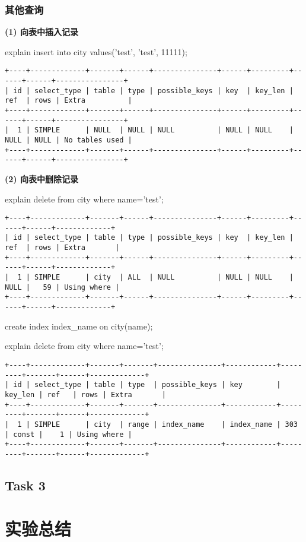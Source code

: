 \documentclass[a4paper, 11pt, nofonts, nocap, fancyhdr]{ctexart}
\begin{document}
\subsubsection{其他查询}

\textbf{(1) 向表中插入记录} 

explain insert into city values('test', 'test', 11111);

\begin{verbatim}
+----+-------------+-------+------+---------------+------+---------+------+------+----------------+
| id | select_type | table | type | possible_keys | key  | key_len | ref  | rows | Extra          |
+----+-------------+-------+------+---------------+------+---------+------+------+----------------+
|  1 | SIMPLE      | NULL  | NULL | NULL          | NULL | NULL    | NULL | NULL | No tables used |
+----+-------------+-------+------+---------------+------+---------+------+------+----------------+
\end{verbatim}

\vspace{0.7cm}

\textbf{(2) 向表中删除记录} 

explain delete from city where name='test';

\begin{verbatim}
+----+-------------+-------+------+---------------+------+---------+------+------+-------------+
| id | select_type | table | type | possible_keys | key  | key_len | ref  | rows | Extra       |
+----+-------------+-------+------+---------------+------+---------+------+------+-------------+
|  1 | SIMPLE      | city  | ALL  | NULL          | NULL | NULL    | NULL |   59 | Using where |
+----+-------------+-------+------+---------------+------+---------+------+------+-------------+
\end{verbatim}

create index index\_name on city(name);

explain delete from city where name='test';

\begin{verbatim}
+----+-------------+-------+-------+---------------+------------+---------+-------+------+-------------+
| id | select_type | table | type  | possible_keys | key        | key_len | ref   | rows | Extra       |
+----+-------------+-------+-------+---------------+------------+---------+-------+------+-------------+
|  1 | SIMPLE      | city  | range | index_name    | index_name | 303     | const |    1 | Using where |
+----+-------------+-------+-------+---------------+------------+---------+-------+------+-------------+
\end{verbatim}

\subsection{Task 3}


\section{实验总结}
\end{document}
